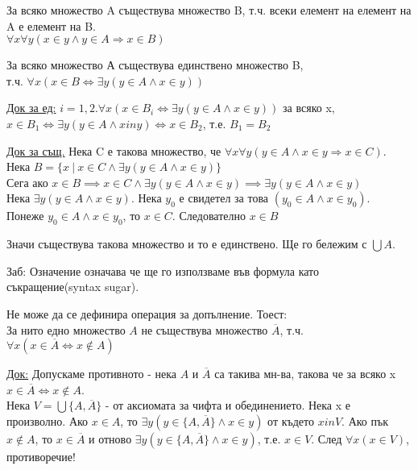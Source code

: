 \documentclass[fleqn, titlepage, 12pt]{report}
\begin{document}
 За всяко множество A съществува множество B, т.ч. всеки елемент на елемент на A е елемент на B.\\
$ \forall{x} \forall{y} (x \in y \land y \in A \Rightarrow x \in B)$
\bigbreak

 За всяко множество А съществува единствено множество B,\\
т.ч. $ \forall{x} (x \in B \Leftrightarrow \exists{y} (y \in A \land x \in y))$
\bigbreak

\underline{Док за ед:}
$i = 1, 2. \forall{x} (x \in B_i \Leftrightarrow \exists{y} (y \in A \land x \in y))$ за всяко x,\\
$x \in B_1 \Leftrightarrow \exists{y} (y \in A \land x in y)\Leftrightarrow x \in B_2$, т.е. $B_1 = B_2$
\bigbreak

\underline{Док за същ.} Нека C е такова множество, че
$ \forall{x} \forall{y} (y \in A \land x \in y \Rightarrow x \in C)$.\\
Нека $B = \{x\ |\ x \in  C \land \exists{y} (y \in A \land x \in y)\}$\\
Сега ако $x \in B \implies x \in C \land \exists{y} (y \in A \land x \in y) \implies \exists{y} (y \in A \land x \in y)$\\
Нека $ \exists{y} (y \in A \land x \in y)$. Нека $y_0$ е свидетел за това $(y_0 \in A \land x \in y_0)$.\\
Понеже $y_0 \in A \land x \in y_0$, то $x \in C$. Следователно $x \in B$
\bigbreak

Значи съществува такова множество и то е единствено. Ще го бележим с $\bigcup A$.
\bigbreak

Заб: Означение означава че ще го използваме във формула като съкращение(syntax sugar).
\bigbreak

Не може да се дефинира операция за допълнение. Тоест:\\
 За нито едно множество $A$ не съществува множество
$\overline A$, т.ч. $ \forall{x} (x \in \overline{A} \Leftrightarrow x \notin A)$
\bigbreak

\underline{Док:} Допускаме противното - нека $A$ и $\overline{A}$ са такива мн-ва, такова че за всяко x
$x \in \overline{A} \Leftrightarrow x \notin A$.\\
Нека $V = \bigcup \{ A, \overline{A}\}$ - от аксиомата за чифта и обединението. Нека x е произволно. Ако $x \in A$, то
$ \exists{y} (y \in \{ A, \overline{A}\} \land  x \in y)$ от където $x in V$. Ако пък $x \notin A$, то $x \in \overline{A}$
и отново $ \exists{y} (y \in \{ A, \overline{A}\} \land x \in y)$, т.е.
$x \in V$. След $ \forall{x} (x \in V)$, противоречие!
\bigbreak
\end{document}
